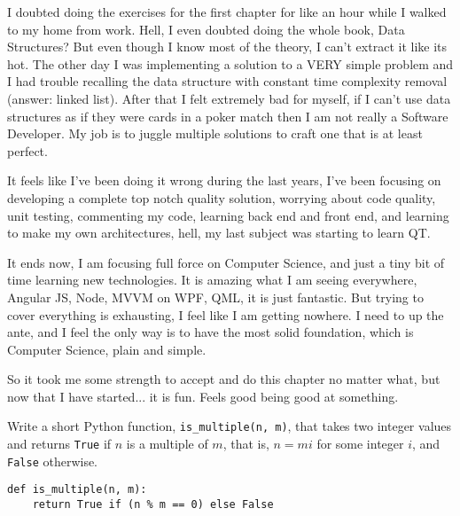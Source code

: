 
I doubted doing the exercises for the first chapter for like an hour while I walked to my home from work. Hell, I even doubted doing the whole book, Data Structures? But even though I know most of the theory, I can't extract it like its hot. The other day I was implementing a solution to a VERY simple problem and I had trouble recalling the data structure with constant time complexity removal (answer: linked list). After that I felt extremely bad for myself, if I can't use data structures as if they were cards in a poker match then I am not really a Software Developer. My job is to juggle multiple solutions to craft one that is at least perfect.

 \label{sec:reshaping}

It feels like I've been doing it wrong during the last years, I've been focusing on developing a complete top notch quality solution, worrying about code quality, unit testing, commenting my code, learning back end and front end, and learning to make my own architectures, hell, my last subject was starting to learn QT.

It ends now, I am focusing full force on Computer Science, and just a tiny bit of time learning new technologies. It is amazing what I am seeing everywhere, Angular JS, Node, MVVM on WPF, QML, it is just fantastic. But trying to cover everything is exhausting, I feel like I am getting nowhere. I need to up the ante, and I feel the only way is to have the most solid foundation, which is Computer Science, plain and simple.

\label{ssec:Exercises}

So it took me some strength to accept and do this chapter no matter what, but now that I have started... it is fun. Feels good being good at something. 

 \label{sssec:ex1_1}


Write a short Python function, \texttt{is_multiple(n, m)}, that takes two integer values and returns \texttt{True} if $n$ is a multiple of $m$, that is, $n = mi$ for some integer $i$, and \texttt{False} otherwise.

\begin{lstlisting}
def is_multiple(n, m):
    return True if (n % m == 0) else False
\end{lstlisting}

